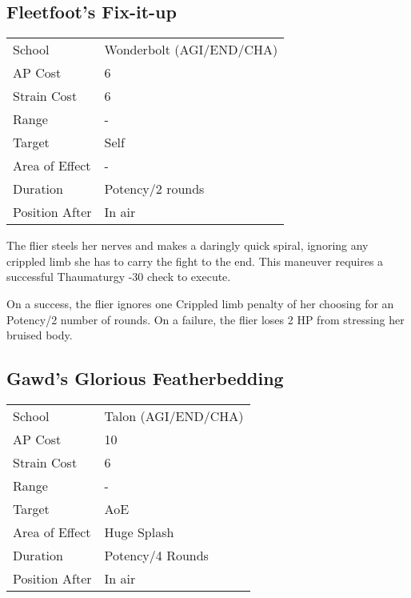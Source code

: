 \documentclass[11pt,a4paper,twocolumn]{book}
\begin{document}
\subsection*{Fleetfoot's Fix-it-up}
{
	\begin{tabu} to 75mm{| X[l,4] | X[l,7] |}
		\hline
		School 			& Wonderbolt (AGI/END/CHA)		\\
		AP Cost	      	& 6 				\\
		Strain Cost     & 6 				\\
		Range     		& - 				\\
		Target      	& Self 				\\
		Area of Effect  & -	 				\\
		Duration     	& Potency/2 rounds	 	\\
		Position After  & In air 			\\ \hline
	\end{tabu}
	
}

\medskip

The flier steels her nerves and makes a daringly quick spiral, ignoring any crippled limb she has to carry the fight to the end. This maneuver requires a successful Thaumaturgy -30 check to execute.

On a success, the flier ignores one Crippled limb penalty of her choosing for an Potency/2 number of rounds. On a failure, the flier loses 2 HP from stressing her bruised body.

\medskip

\subsection*{Gawd's Glorious Featherbedding}
{
	\begin{tabu} to 75mm{| X[l,4] | X[l,7] |}
		\hline
		School 			& Talon (AGI/END/CHA)			\\
		AP Cost	      	& 10 				\\
		Strain Cost     & 6 				\\
		Range     		& - 				\\
		Target      	& AoE 				\\
		Area of Effect  & Huge Splash 	 	\\
		Duration     	& Potency/4 Rounds 	\\
		Position After  & In air 			\\ \hline
	\end{tabu}
	
}
\end{document}
